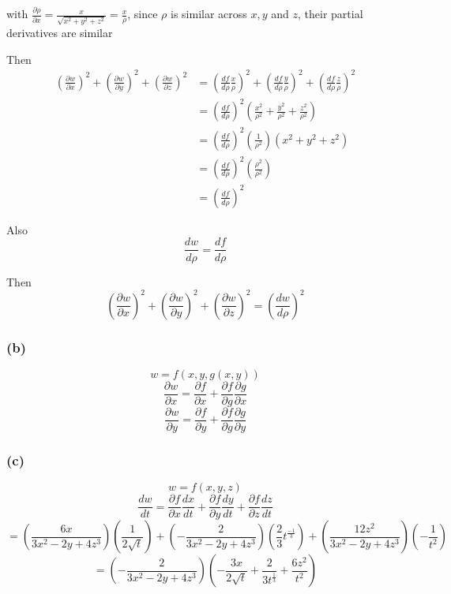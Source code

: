 \documentclass{article}
\begin{document}
with \(\frac{\partial \rho}{\partial x} = \frac{x}{\sqrt{x^2 + y^2 + z^2}} = \frac{x}{\rho}\), since \(\rho\) is similar
across \(x,y\) and \(z\), their partial derivatives are similar

Then
\begin{align*}
    \left(\frac{\partial w}{\partial x}\right)^2 + \left(\frac{\partial w}{\partial y}\right)^2 + \left(\frac{\partial w}{\partial z}\right)^2 &= 
    \left(\frac{df}{d \rho} \frac{x}{\rho}\right)^2 + \left(\frac{df}{d \rho} \frac{y}{\rho}\right)^2 + \left(\frac{df}{d \rho} \frac{z}{\rho}\right)^2 \\
    &= \left(\frac{df}{d \rho}\right)^2\left(\frac{x^2}{\rho^2} + \frac{y^2}{\rho^2} + \frac{z^2}{\rho^2}\right) \\
    &= \left(\frac{df}{d \rho}\right)^2\left(\frac{1}{\rho^2}\right)(x^2 + y^2 + z^2) \\
    &= \left(\frac{df}{d \rho}\right)^2\left(\frac{\rho^2}{\rho^2}\right) \\
    &= \left(\frac{df}{d \rho}\right)^2
\end{align*}

Also
\[
\frac{dw}{d\rho} = \frac{df}{d \rho}
\]

Then 
\[
\left(\frac{\partial w}{\partial x}\right)^2 + \left(\frac{\partial w}{\partial y}\right)^2 + \left(\frac{\partial w}{\partial z}\right)^2 = \left(\frac{dw}{d \rho}\right)^2
\]





\subsubsection*{(b)}
\[
w = f(x,y,g(x,y))
\]
\[
\frac{\partial w}{\partial x} = \frac{\partial f}{\partial x} + \frac{\partial f}{\partial g}\frac{\partial g}{\partial x}
\]
\[
\frac{\partial w}{\partial y} = \frac{\partial f}{\partial y} + \frac{\partial f}{\partial g}\frac{\partial g}{\partial y}
\]


\subsubsection*{(c)}

\[
w = f(x,y,z)
\]
\[
\frac{dw}{dt} = \frac{\partial f}{\partial x} \frac{dx}{dt} + \frac{\partial f}{\partial y} \frac{dy}{dt} + \frac{\partial f}{\partial z} \frac{dz}{dt}
\]
\[
= \left(\frac{6x}{3x^2 - 2y + 4z^3}\right)\left(\frac{1}{2\sqrt{t}}\right) + \left(-\frac{2}{3x^2 - 2y + 4z^3}\right)
\left(\frac{2}{3}t^{\frac{-1}{3}}\right) + \left(\frac{12z^2}{3x^2 - 2y + 4z^3}\right)\left(-\frac{1}{t^2}\right)
\]
\[
= \left(-\frac{2}{3x^2 - 2y + 4z^3}\right)\left(-\frac{3x}{2\sqrt{t}} + \frac{2}{3t^{\frac{1}{3}}} + \frac{6z^2}{t^2}\right)
\]
\end{document}
